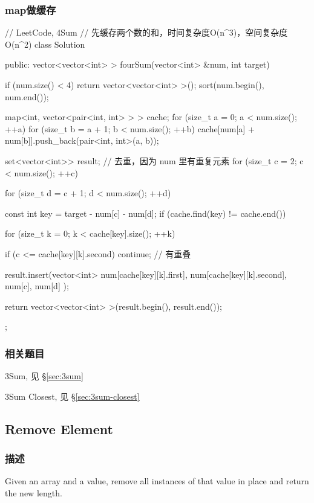 \subsubsection{map做缓存}
\begin{Code}
// LeetCode, 4Sum
// 先缓存两个数的和，时间复杂度O(n^3)，空间复杂度O(n^2)
class Solution {
public:
    vector<vector<int> > fourSum(vector<int> &num, int target) {
        if (num.size() < 4) return  vector<vector<int> >();
        sort(num.begin(), num.end());

        map<int, vector<pair<int, int> > > cache;
        for (size_t a = 0; a < num.size(); ++a) {
            for (size_t b = a + 1; b < num.size(); ++b) {
                cache[num[a] + num[b]].push_back(pair<int, int>(a, b));
            }
        }

        set<vector<int>> result; // 去重，因为 num 里有重复元素
        for (size_t c = 2; c < num.size(); ++c) {
            for (size_t d = c + 1; d < num.size(); ++d) {
                const int key = target - num[c] - num[d];
                if (cache.find(key) != cache.end()) {
                    for (size_t k = 0; k < cache[key].size(); ++k) {
                        if (c <= cache[key][k].second) continue; // 有重叠

                        result.insert(vector<int> { num[cache[key][k].first],
                            num[cache[key][k].second], num[c], num[d] });
                    }
                }
            }
        }
        return vector<vector<int> >(result.begin(), result.end());
    }
};
\end{Code}


\subsubsection{相关题目}
\begindot
\item 3Sum, 见 \S \ref{sec:3sum}
\item 3Sum Closest, 见 \S \ref{sec:3sum-closest}
\myenddot


\subsection{Remove Element} %
\label{sec:remove-element }


\subsubsection{描述}
Given an array and a value, remove all instances of that value in place and return the new length.

